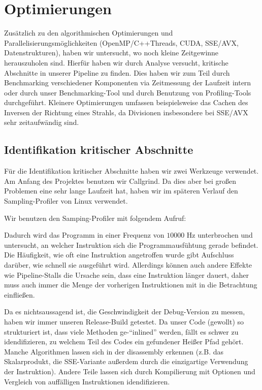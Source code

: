 \section{Optimierungen}
Zusätzlich zu den algorithmischen Optimierungen und Parallelisierungsmöglichkeiten (OpenMP/C++Threads, CUDA, SSE/AVX, Datenstrukturen), haben wir untersucht, wo noch kleine Zeitgewinne herauszuholen sind.
Hierfür haben wir durch Analyse versucht, kritische Abschnitte in unserer Pipeline zu finden.
Dies haben wir zum Teil durch Benchmarking verschiedener Komponenten via Zeitmessung der Laufzeit intern oder durch unser Benchmarking-Tool und durch Benutzung von Profiling-Tools durchgeführt.
Kleinere Optimierungen umfassen beispielsweise das Cachen des Inversen der Richtung eines Strahls, da Divisionen insbesondere bei SSE/AVX sehr zeitaufwändig sind.

\subsection{Identifikation kritischer Abschnitte}
\label{ssec:crit-section}

Für die Identifikation kritischer Abschnitte haben wir zwei Werkzeuge verwendet. Am Anfang des Projektes benutzen wir Callgrind. Da dies aber bei großen Problemen eine sehr lange Laufzeit hat, haben wir im späteren Verlauf den  Sampling-Profiler von Linux verwendet.

Wir benutzen den Samping-Profiler mit folgendem Aufruf:


Dadurch wird das Programm in einer Frequenz von $10000$ Hz unterbrochen und untersucht, an welcher Instruktion sich die Programmausfühtung gerade befindet. Die Häufigkeit, wie oft eine Instruktion angetroffen wurde gibt Aufschluss darüber, wie schnell sie ausgeführt wird. Allerdings können auch andere Effekte wie Pipeline-Stalls die Ursache sein, dass eine Instruktion länger dauert, daher muss auch immer die Menge der vorherigen Instruktionen mit in die Betrachtung einfließen.

Da es nichtsaussagend ist, die Geschwindigkeit der Debug-Version zu messen, haben wir immer unseren Release-Build getestet. Da unser Code (gewollt) so strukturiert ist, dass viele Methoden ge-"`inlined"' werden, fällt es schwer zu idendifizieren, zu welchem Teil des Codes ein gefundener Heißer Pfad gehört. Manche Algorithmen lassen sich in der disassembly erkennen (z.B. das Skalarprodukt, die SSE-Variante außerdem durch die einzigartige Verwendung der  Instruktion). Andere Teile lassen sich durch Kompilierung mit  Optionen und Vergleich von auffälligen Instruktionen idendifizieren.

